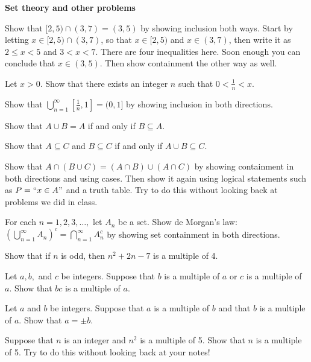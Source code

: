 \pagebreak

\noindent
{\bf Set theory and other problems}
\blist{0.2in}
\item Show that $[2,5) \cap (3,7) = (3,5)$ by showing inclusion both ways.
Start by letting $x \in [2,5) \cap (3,7)$, so that $x \in [2,5)$ and $x \in (3,7)$, then write it as $2 \leq x < 5$ and $3 < x < 7$.
There are four inequalities here.  Soon enough you can conclude that $x \in (3,5)$.
Then show containment the other way as well.

\item Let $x > 0$.
Show that there exists an integer $n$ such that $0 < \frac{1}{n} < x$.

\item Show that $\bigcup_{n=1}^{\infty} [\frac{1}{n}, 1] = (0,1]$ by showing inclusion in both directions.

\item Show that $A \cup B = A$ if and only if $B \subseteq A$.

\item Show that $A \subseteq C$ and $B \subseteq C$ if and only if $A \cup B \subseteq C$.

\item Show that $A \cap (B \cup C) = (A \cap B) \cup (A \cap C)$ by showing containment in both directions and using cases.
Then show it again using logical statements such as $P = ``x \in A"$ and a truth table.
Try to do this without looking back at problems we did in class.

\item For each $n = 1, 2, 3, \ldots,$ let $A_n$ be a set.
Show de Morgan's law:  $\left( \bigcup_{n = 1}^{\infty} A_n \right)^c = \bigcap_{n = 1}^{\infty} A_n^c$ by showing set containment in both directions.

\item Show that if $n$ is odd, then $n^2 + 2n - 7$ is a multiple of 4.

\item Let $a, b,$ and $c$ be integers.
Suppose that $b$ is a multiple of $a$ or $c$ is a multiple of $a$.
Show that $bc$ is a multiple of $a$.
\item Let $a$ and $b$ be integers.
Suppose that $a$ is a multiple of $b$ and that $b$ is a multiple of $a$.
Show that $a = \pm b$.

\item Suppose that $n$ is an integer and $n^2$ is a multiple of 5.
Show that $n$ is a multiple of 5.
Try to do this without looking back at your notes!

